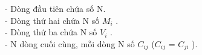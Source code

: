 - Dòng đầu tiên chứa số N.   
\\   - Dòng thứ hai chứa N số $M_{i}$   .   
\\   - Dòng thứ ba chứa N số $V_{i}$   .   
\\   - N dòng cuối cùng, mỗi dòng N số $C_{ij}$   ($C_{ij}$   = $C_{ji}$   ).